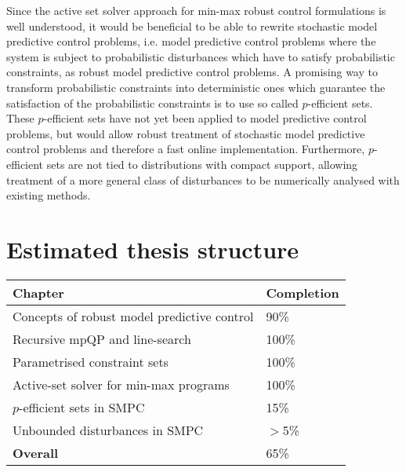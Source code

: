 \documentclass[a4paper,12pt]{scrartcl}
\begin{document}
Since the active set solver approach for min-max robust control formulations is well understood, it would be beneficial
to be able to rewrite stochastic model predictive control problems, i.e. model predictive control problems where the system
is subject to probabilistic disturbances which have to satisfy probabilistic constraints, as robust model predictive control
problems.
%
A promising way to transform probabilistic constraints into deterministic ones which guarantee the satisfaction of the probabilistic
constraints is to use so called $p$-efficient sets.
%
These $p$-efficient sets have not yet been applied to model predictive control problems, but would allow robust treatment of stochastic
model predictive control problems and therefore a fast online implementation.
%
Furthermore, $p$-efficient sets are not tied to distributions with compact support, allowing treatment of a more general class of
disturbances to be numerically analysed with existing methods.
\pagebreak

\section*{Estimated thesis structure}

\setcounter{subsection}{1}

\singlespacing
\begin{tabular}{|p{}|p{}|}
\hline
\textbf{Chapter} & \textbf{Completion}\hfill \\
\hline\hline
Concepts of robust model predictive control & 90\% \\
\hline 
Recursive mpQP and line-search & 100\% \\
\hline
Parametrised constraint sets & 100\% \\
\hline
Active-set solver for min-max programs & 100\% \\
\hline
$p$-efficient sets in SMPC & 15\% \\
\hline
Unbounded disturbances in SMPC & $>$5\% \\
\hline\hline
\textbf{Overall} & 65\% \\ \hline
\end{tabular}

\doublespacing
\end{document}
